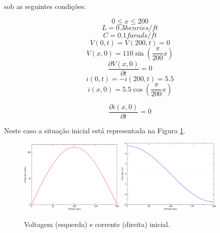 \documentclass[a4wide]{report}
\begin{document}
sob as seguintes condições:

\begin{equation*}
0 \leq x \leq 200
\end{equation*}
\begin{equation*}
L = 0.3 henries/ft
\end{equation*}
\begin{equation*}
C = 0.1 farads/ft
\end{equation*}
\begin{equation*}
V(0,t) = V(200,t) = 0
\end{equation*}
\begin{equation*}
V(x,0) = 110 \sin \left(\frac{\pi}{200} x\right)
\end{equation*}
\begin{equation*}
\frac{\partial V(x,0)}{\partial t} = 0
\end{equation*}
\begin{equation*}
i(0,t) = -i(200,t) = 5.5
\end{equation*}
\begin{equation*}
i(x,0) = 5.5 \cos \left(\frac{\pi}{200} x\right)
\end{equation*}

\begin{equation*}
\frac{\partial i(x,0)}{\partial t} = 0
\end{equation*}

Neste caso a situação inicial está representada na Figura \ref{3a}.

\begin{figure}[!htb]
\centering
\includegraphics[width=0.447\textwidth]{V0.pdf}
\includegraphics[width=0.447\textwidth]{i0.pdf}
\caption{Voltagem (esquerda) e corrente (direita) inicial.}
\label{3a}
\end{figure}
\end{document}

